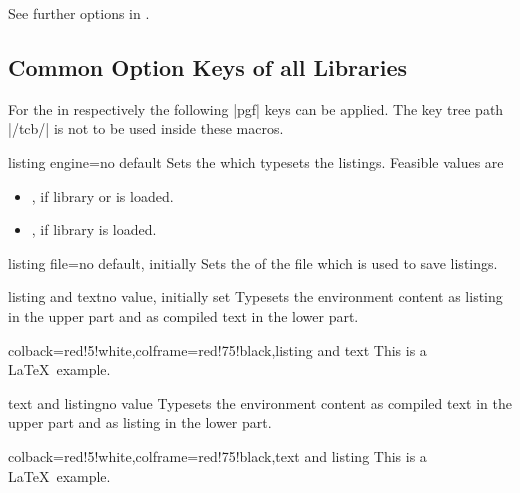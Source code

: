 See further options in .


\clearpage
\subsection{Common Option Keys of all Libraries}\label{sec:commonlistingkeys}
For the  in  respectively 
the following |pgf| keys can be applied. The key tree path |/tcb/| is not to
be used inside these macros.

\begin{docTcbKey}{listing engine}{=}{no default}
  Sets the  which typesets the listings. Feasible values are
  \begin{itemize}
  \item{}, if library  or
   is loaded.
  \item{}, if library  is loaded.
  \end{itemize}
\end{docTcbKey}

\begin{docTcbKey}{listing file}{=}{no default, initially }
  Sets the  of the file which is used to save listings.
\end{docTcbKey}


\begin{docTcbKey}{listing and text}{}{no value, initially set}
  Typesets the environment content as listing in the upper part and
  as compiled text in the lower part.
\begin{dispExample}
\begin{tcblisting}{colback=red!5!white,colframe=red!75!black,listing and text}
This is a \LaTeX\ example.
\end{tcblisting}
\end{dispExample}
\end{docTcbKey}


\begin{docTcbKey}{text and listing}{}{no value}
  Typesets the environment content as compiled text in the upper part and
  as listing in the lower part.
\begin{dispExample}
\begin{tcblisting}{colback=red!5!white,colframe=red!75!black,text and listing}
This is a \LaTeX\ example.
\end{tcblisting}
\end{dispExample}
\end{docTcbKey}


